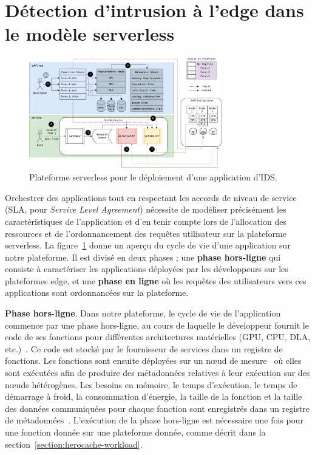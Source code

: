 \section{Détection d'intrusion à l'edge dans le modèle serverless}
\label{section:herocache-before-contrib}

\begin{figure}[!ht]
    \centering
    \includegraphics[width=0.75\textwidth]{5_Chapitre5/figures/serverless-platform-storage.png}
    \caption{Plateforme serverless pour le déploiement d'une application d'\gls{IDS}.}
    \label{figure:herocache-serverless-platform}
\end{figure}

Orchestrer des applications tout en respectant les accords de niveau de service (\gls{SLA}, pour \textit{Service Level Agreement}) nécessite de modéliser précisément les caractéristiques de l'application et d'en tenir compte lors de l'allocation des ressources et de l'ordonnancement des requêtes utilisateur sur la plateforme serverless. La figure~\ref{figure:herocache-serverless-platform} donne un aperçu du cycle de vie d'une application sur notre plateforme. Il est divisé en deux phases ; une \textbf{phase hors-ligne} qui consiste à caractériser les applications déployées par les développeurs sur les plateformes edge, et une \textbf{phase en ligne} où les requêtes des utilisateurs vers ces applications sont ordonnancées sur la plateforme.

\textbf{Phase hors-ligne}. Dans notre plateforme, le cycle de vie de l'application commence par une phase hors-ligne, au cours de laquelle le développeur fournit le code de ses fonctions pour différentes architectures matérielles (\gls{GPU}, \gls{CPU}, \gls{DLA}, etc.)~. Ce code est stocké par le fournisseur de services dans un registre de fonctions. Les fonctions sont ensuite déployées sur un nœud de mesure~ où elles sont exécutées afin de produire des métadonnées relatives à leur exécution sur des nœuds hétérogènes. Les besoins en mémoire, le temps d'exécution, le temps de démarrage à froid, la consommation d'énergie, la taille de la fonction et la taille des données communiquées pour chaque fonction sont enregistrés dans un registre de métadonnées~. L'exécution de la phase hors-ligne est nécessaire une fois pour une fonction donnée sur une plateforme donnée, comme décrit dans la section~\ref{section:herocache-workload}.

